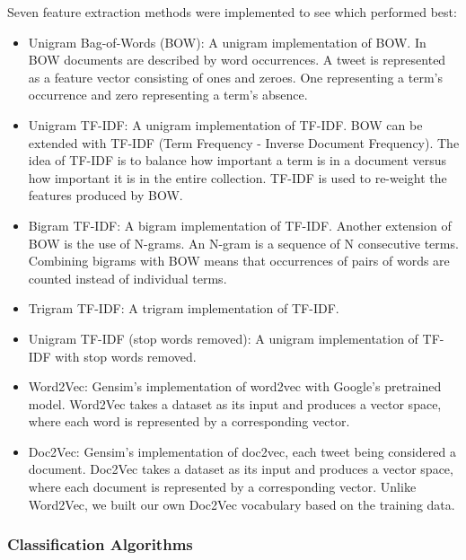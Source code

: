 Seven feature extraction methods were implemented to see which performed best:
\begin{itemize}
    \item Unigram Bag-of-Words (BOW): A unigram implementation of BOW. In BOW documents are described by word occurrences. A tweet is represented as a feature vector consisting of ones and zeroes. One representing a term's occurrence and zero representing a term's absence.
    \item Unigram TF-IDF: A unigram implementation of TF-IDF. BOW can be extended with TF-IDF (Term Frequency - Inverse Document Frequency). The idea of TF-IDF is to balance how important a term is in a document versus how important it is in the entire collection. TF-IDF is used to re-weight the features produced by BOW.
    \item Bigram TF-IDF: A bigram implementation of TF-IDF. Another extension of BOW is the use of N-grams. An N-gram is a sequence of N consecutive terms. Combining bigrams with BOW means that occurrences of pairs of words are counted instead of individual terms.
    \item Trigram TF-IDF: A trigram implementation of TF-IDF.
    \item Unigram TF-IDF (stop words removed): A unigram implementation of TF-IDF with stop words removed.
    \item Word2Vec: Gensim's implementation of word2vec with Google's pretrained model. Word2Vec takes a dataset as its input and produces a vector space, where each word is represented by a corresponding vector.
    \item Doc2Vec: Gensim's implementation of doc2vec, each tweet being considered a document. Doc2Vec takes a dataset as its input and produces a vector space, where each document is represented by a corresponding vector. Unlike Word2Vec, we built our own Doc2Vec vocabulary based on the training data.
\end{itemize}

\subsubsection{Classification Algorithms}

